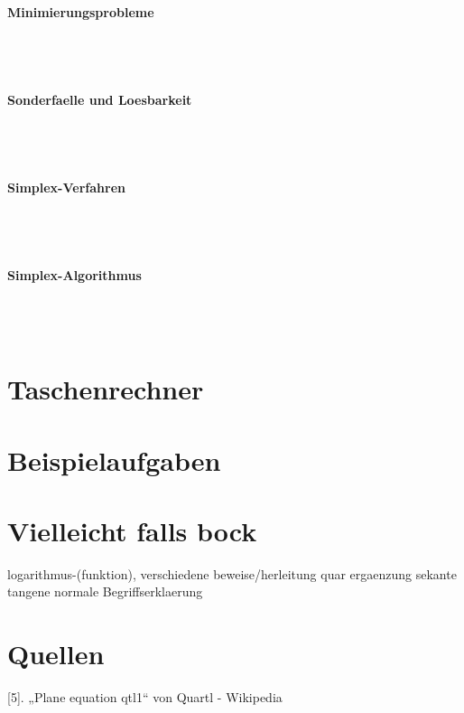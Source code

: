 \documentclass[a4paper]{article} %
\begin{document}
	\paragraph{Minimierungsprobleme}
	 \hspace{0 cm} \\ \noindent \\
	\paragraph{Sonderfaelle und Loesbarkeit}
	 \hspace{0 cm} \\ \noindent \\
	\paragraph{Simplex-Verfahren}
	 \hspace{0 cm} \\ \noindent \\
	\paragraph{Simplex-Algorithmus}
	 \hspace{0 cm} \\ \noindent \\
	\section{Taschenrechner}
	\section{Beispielaufgaben}
	\section{Vielleicht falls bock}
	logarithmus-(funktion), verschiedene beweise/herleitung
	quar ergaenzung sekante tangene normale
	Begriffserklaerung

	\section{Quellen}
	[5]. „Plane equation qtl1“ von Quartl - Wikipedia
\end{document}
